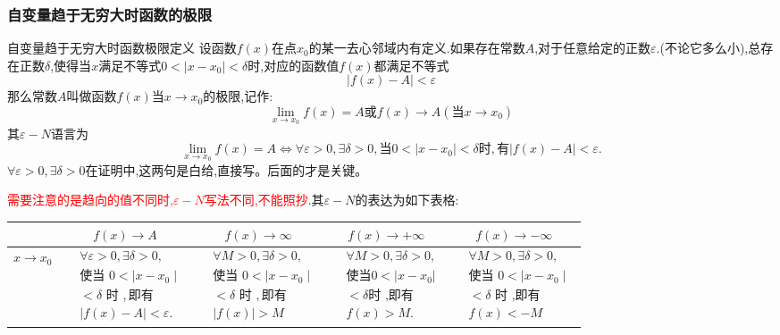 \documentclass[12pt, a4paper, oneside, UTF8]{ctexbook}
\begin{document}
\begin{sloppypar}
    \subsubsection{自变量趋于无穷大时函数的极限}
    \begin{defn}{自变量趋于无穷大时函数极限定义}{}
        设函数$f(x)$在点$x_0$的某一去心邻域内有定义.如果存在常数$A$,对于任意给定的正数$\varepsilon$.(不论它多么小),总存在正数$\delta$,使得当$x$满足不等式$0<|x-x_0|<\delta$时,对应的函数值$f(x)$都满足不等式
        $$
            |f(x)-A|<\varepsilon
        $$
        那么常数$A$叫做函数$f(x)$当$x \to x_0$的极限,记作:
        $$
            \lim_{x\to x_0}f(x)=A\text{或}f(x)\to A(\text{当}x\to x_0)
        $$
        其$\varepsilon-N$语言为
        $$
            \lim\limits_{x\to x_0}f(x)=A\Leftrightarrow\forall\varepsilon>0,\exists\delta>0,\text{当}0<|x-x_0|<\delta\text{时},\text{有}|f(x)-A|<\varepsilon.
        $$
        $\forall\varepsilon>0,\exists\delta>0$在证明中,这两句是白给,直接写。后面的才是关键。
    \end{defn}
    \textcolor{red}{需要注意的是趋向的值不同时,$\varepsilon -N$写法不同,不能照抄}.其$\varepsilon -N$的表达为如下表格:
    \begin{center}
        \begin{tabular}{|c|c|c|c|c|}
            \hline
            & \textbf{$f(x)\to A$} & \textbf{$f(x)\to \infty$} & \textbf{$f(x)\to +\infty$} & \textbf{$f(x)\to -\infty$}\\
            \hline
            $x \to x_0$       & $\begin{aligned}&\forall\varepsilon>0,\exists\delta>0, \\&\text{使当 }0<\mid x-x_0\mid  \\&<\delta\text{ 时 },\text{即有} \\&|f(x)-A|<\varepsilon.\end{aligned}$ & $\begin{aligned}&\forall M>0,\exists\delta>0, \\&\text{使当 }0<\mid x-x_{0}\mid  \\&<\delta\text{ 时 },\text{即有}\\& |f(x)|>M\end{aligned}$ & $\begin{aligned}&\forall M>0,\exists\delta>0, \\&\text{使当} 0<|x-x_0| \\ &<\delta \text{时 ,即有} \\ &f(x)>M.\end{aligned}$      & $\begin{aligned}&\forall M>0,\exists\delta>0, \\&\text{使当 }0<\mid x-x_{0}\mid  \\&<\delta\text{ 时 ,即有}\\& f(x) <-M\end{aligned}$ \\ \hline

\end{tabular}
\end{center}
\end{sloppypar}
\end{document}

